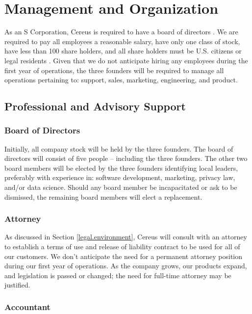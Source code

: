 {\let\cleardoublepage\relax \chapter{Management and Organization}}

As an S Corporation, Cereus is required to have a board of directors \cite{UpCounsel.2020}. We are required to pay all employees a reasonable salary, have only one class of stock, have less than 100 share holders, and all share holders must be U.S. citizens or legal residents \cite{wave.2019}. Given that we do not anticipate hiring any employees during the first year of operations, the three founders will be required to manage all operations pertaining to: support, sales, marketing, engineering, and product. 

\section{Professional and Advisory Support}

\subsection{Board of Directors}

Initially, all company stock will be held by the three founders. The board of directors will consist of five people -- including the three founders. The other two board members will be elected by the three founders identifying local leaders, preferably with experience in: software development, marketing, privacy law, and/or data science. Should any board member be incapacitated or ask to be dismissed, the remaining board members will elect a replacement.

\subsection{Attorney}

As discussed in Section \ref{legal.environment}, Cereus will consult with an attorney to establish a terms of use and release of liability contract to be used for all of our customers. We don't anticipate the need for a permanent attorney position during our first year of operations. As the company grows, our products expand, and legislation is passed or changed; the need for full-time attorney may be justified. 

\subsection{Accountant}

